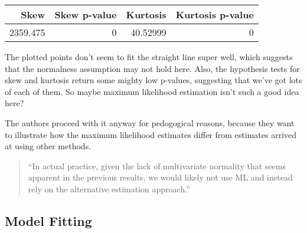 \documentclass[
  letterpaper,
  DIV=11,
  numbers=noendperiod]{scrreprt}
\newenvironment{Shaded}{\begin{snugshade}}{\end{snugshade}}
\newcommand{\CommentTok}[1]{\textcolor[rgb]{0.37,0.37,0.37}{#1}}
\newcommand{\FunctionTok}[1]{\textcolor[rgb]{0.28,0.35,0.67}{#1}}
\newcommand{\NormalTok}[1]{\textcolor[rgb]{0.00,0.23,0.31}{#1}}
\newcommand{\OtherTok}[1]{\textcolor[rgb]{0.00,0.23,0.31}{#1}}
\newcommand{\SpecialCharTok}[1]{\textcolor[rgb]{0.37,0.37,0.37}{#1}}
\newcommand{\StringTok}[1]{\textcolor[rgb]{0.13,0.47,0.30}{#1}}
\begin{document}
\begin{Shaded}
\end{Shaded}

\begin{longtable}[]{@{}rrrr@{}}
\toprule()
Skew & Skew p-value & Kurtosis & Kurtosis p-value \\
\midrule()
\endhead
2359.475 & 0 & 40.52999 & 0 \\
\bottomrule()
\end{longtable}

The plotted points don't seem to fit the straight line super well, which
suggests that the normalness assumption may not hold here. Also, the
hypothesis tests for skew and kurtosis return some mighty low p-values,
suggesting that we've got lots of each of them. So maybe maximum
likelihood estimation isn't such a good idea here?

The authors proceed with it anyway for pedogogical reasons, because they
want to illustrate how the maximum likelihood estimates differ from
estimates arrived at using other methods.

\begin{quote}
``In actual practice, given the lack of multivariate normality that
seems apparent in the previous results, we would likely not use ML and
instead rely on the alternative estimation approach.''
\end{quote}

\hypertarget{model-fitting}{%
\subsection{Model Fitting}\label{model-fitting}}
\end{document}
